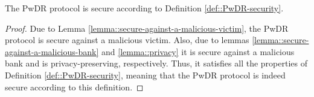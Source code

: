 \begin{theorem}
The PwDR protocol is secure according to Definition \ref{def::PwDR-security}.
\end{theorem}



\begin{proof}
Due to Lemma \ref{lemma::secure-against-a-malicious-victim}, the PwDR protocol is secure against a malicious victim. Also, due to lemmas \ref{lemma::secure-against-a-malicious-bank} and \ref{lemma::privacy} it is  secure against a malicious bank and is privacy-preserving, respectively. Thus, it satisfies all the properties of Definition \ref{def::PwDR-security}, meaning that  the PwDR protocol is indeed secure according to this definition. 
\end{proof}



